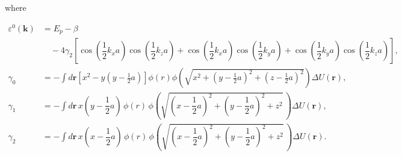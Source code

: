 \documentclass{article}
\begin{document}
where

\begin{align*}
\varepsilon^{0}(\mathbf{k}) &= E_{p} - \beta \\
&\quad - 4 \gamma_{2} \left[ \cos \left( \dfrac{1}{2} k_{x} a \right) \cos \left( \dfrac{1}{2} k_{z} a \right) + \cos \left( \dfrac{1}{2} k_{x} a \right) \cos \left( \dfrac{1}{2} k_{y} a \right) + \cos \left( \dfrac{1}{2} k_{y} a \right) \cos \left( \dfrac{1}{2} k_{z} a \right) \right], \\[2ex]
\gamma_{0} &= -\int d\mathbf{r} \left[x^2-y\left(y-\frac{1}{2}a\right)\right] \phi(r) \phi\left(\sqrt{x^2+\left(y-\frac{1}{2}a\right)^2+\left(z-\frac{1}{2}a\right)^2}\right) \Delta U(\mathbf{r}), \\[2ex]
\gamma_{1} &= -\int d\mathbf{r} \, x \left( y - \dfrac{1}{2} a \right) \, \phi(r) \, \phi\left( \sqrt{ \left( x - \dfrac{1}{2} a \right)^{2} + \left( y - \dfrac{1}{2} a \right)^{2} + z^{2} } \, \right) \Delta U(\mathbf{r}), \\[2ex]
\gamma_{2} &= -\int d\mathbf{r} \, x \left( x - \dfrac{1}{2} a \right) \, \phi(r) \, \phi\left( \sqrt{ \left( x - \dfrac{1}{2} a \right)^{2} + \left( y - \dfrac{1}{2} a \right)^{2} + z^{2} } \, \right) \Delta U(\mathbf{r}). \tag{10.34}
\end{align*}
\end{document}
